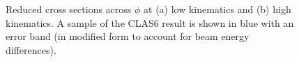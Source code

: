 \begin{figure}[H]
    \centering

    \hfill

    \caption[Reduced Cross Sections Across $\phi$]{Reduced cross sections across $\phi$ at (a) low kinematics and (b) high kinematics. A sample of the CLAS6 result \parencite{Bedlinskiy2014ExclusiveCLAS} is shown in blue with an error band (in modified form to account for beam energy differences). }\label{fig:redxsec_phi}
\end{figure}




\iffalse


